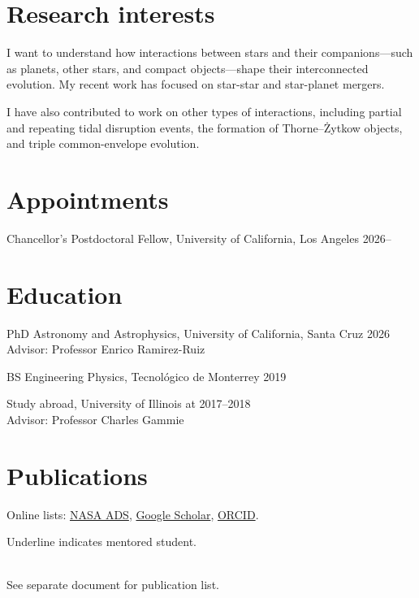 \documentclass{cv}
\begin{document}
\maketitle{}

\ifdefined\withresearchinterests{}
\section*{Research interests}
I want to understand how interactions between stars and their companions---such as planets, other stars, and compact objects---shape their interconnected evolution. My recent work has focused on star-star and star-planet mergers.

I have also contributed to work on other types of interactions, including partial and repeating tidal disruption events, the formation of Thorne--\.{Z}ytkow objects, and triple common-envelope evolution.
\else\fi

\section*{Appointments}
Chancellor’s Postdoctoral Fellow, University of California, Los Angeles \hfill 2026--

\section*{Education}
PhD Astronomy and Astrophysics, University of California, Santa Cruz \hfill 2026\\
Advisor: Professor Enrico Ramirez-Ruiz

BS Engineering Physics, Tecnol\'{o}gico de Monterrey \hfill 2019

Study abroad, University of Illinois at \urbanachampaign{} \hfill 2017--2018\\
Advisor: Professor Charles Gammie

\section*{Publications}
Online lists: \href{\adslibrary}{NASA ADS}, \href{\googlescholar}{Google Scholar}, \href{https://orcid.org/0000-0003-0381-1039}{ORCID}.\\
\ifdefined\withmetrics{}

\else\fi
\ifdefined\withpapers{}
Underline indicates mentored student.


\else
\\See separate document for publication list.
\fi
\end{document}
